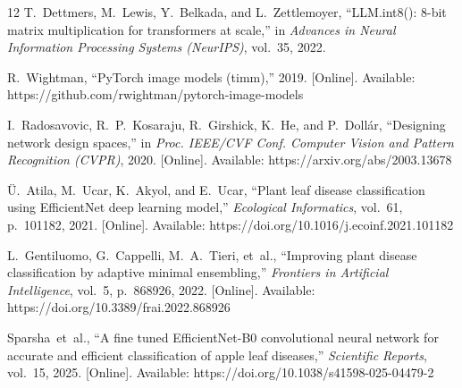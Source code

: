 \documentclass[conference]{IEEEtran}
\begin{document}
\begin{thebibliography}{12}
T.~Dettmers, M.~Lewis, Y.~Belkada, and L.~Zettlemoyer,
``LLM.int8(): 8-bit matrix multiplication for transformers at scale,''
in \emph{Advances in Neural Information Processing Systems (NeurIPS)}, vol.~35, 2022.

R.~Wightman,
``PyTorch image models (timm),''
2019.
[Online]. Available: https://github.com/rwightman/pytorch-image-models

I.~Radosavovic, R.~P.~Kosaraju, R.~Girshick, K.~He, and P.~Doll\'{a}r,
``Designing network design spaces,''
in \emph{Proc. IEEE/CVF Conf. Computer Vision and Pattern Recognition (CVPR)}, 2020.
[Online]. Available: https://arxiv.org/abs/2003.13678

\"{U}.~Atila, M.~Ucar, K.~Akyol, and E.~Ucar,
``Plant leaf disease classification using EfficientNet deep learning model,''
\textit{Ecological Informatics}, vol.~61, p.~101182, 2021.
[Online]. Available: https://doi.org/10.1016/j.ecoinf.2021.101182

L.~Gentiluomo, G.~Cappelli, M.~A.~Tieri, et~al.,
``Improving plant disease classification by adaptive minimal ensembling,''
\textit{Frontiers in Artificial Intelligence}, vol.~5, p.~868926, 2022.
[Online]. Available: https://doi.org/10.3389/frai.2022.868926

Sparsha~et~al.,
``A fine tuned EfficientNet-B0 convolutional neural network for accurate and efficient classification of apple leaf diseases,''
\textit{Scientific Reports}, vol.~15, 2025.
[Online]. Available: https://doi.org/10.1038/s41598-025-04479-2

\end{thebibliography}
\end{document}
